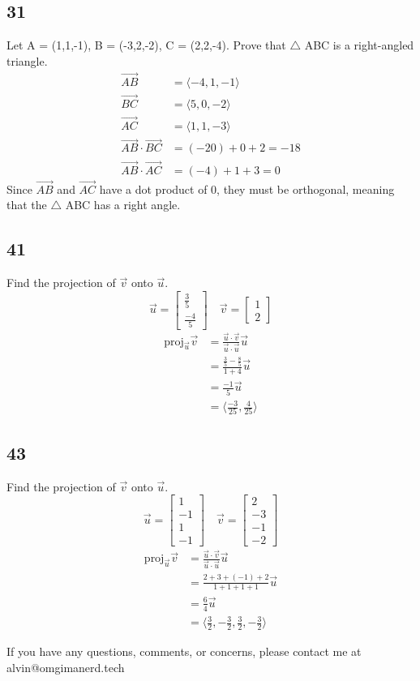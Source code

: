 \documentclass{math}
\begin{document}
\subsection*{31}
Let A = (1,1,-1), B = (-3,2,-2), C = (2,2,-4). Prove that \( \triangle \) ABC is
a right-angled triangle.
\begin{align*}
  \vec{AB} &= \langle-4,1,-1\rangle \\
  \vec{BC} &= \langle5,0,-2\rangle \\
  \vec{AC} &= \langle1,1,-3\rangle \\
  \vec{AB}\cdot\vec{BC} &= (-20)+0+2 = -18 \\
  \vec{AB}\cdot\vec{AC} &= (-4)+1+3 = 0
\end{align*}
Since \( \vec{AB} \) and \( \vec{AC} \) have a dot product of 0, they must be
orthogonal, meaning that the \( \triangle \) ABC has a right angle.

\subsection*{41}
Find the projection of \( \vec{v} \) onto \( \vec{u} \).
\[ \vec{u} = \begin{bmatrix}\frac{3}{5} \\ \frac{-4}{5}\end{bmatrix}\quad
  \vec{v} = \begin{bmatrix}1 \\ 2\end{bmatrix} \]
\begin{align*}
  \text{proj}_{\vec{u}}\vec{v} &=
    \frac{\vec{u}\cdot\vec{v}}{\vec{u}\cdot\vec{u}}\vec{u} \\
  &= \frac{\frac{3}{5}-\frac{8}{5}}{1+4}\vec{u} \\
  &= \frac{-1}{5}\vec{u} \\
  &= \langle\frac{-3}{25},\frac{4}{25}\rangle
\end{align*}

\subsection*{43}
Find the projection of \( \vec{v} \) onto \( \vec{u} \).
\[ \vec{u} = \begin{bmatrix}1 \\ -1 \\ 1 \\ -1\end{bmatrix}\quad
  \vec{v} = \begin{bmatrix}2 \\ -3 \\ -1 \\ -2\end{bmatrix} \]
\begin{align*}
  \text{proj}_{\vec{u}}\vec{v} &=
    \frac{\vec{u}\cdot\vec{v}}{\vec{u}\cdot\vec{u}}\vec{u} \\
  &= \frac{2+3+(-1)+2}{1+1+1+1}\vec{u} \\
  &= \frac{6}{4}\vec{u} \\
  &= \langle\frac{3}{2},-\frac{3}{2},\frac{3}{2},-\frac{3}{2}\rangle
\end{align*}

\begin{center}
  If you have any questions, comments, or concerns, please contact me at
  alvin@omgimanerd.tech
\end{center}
\end{document}
